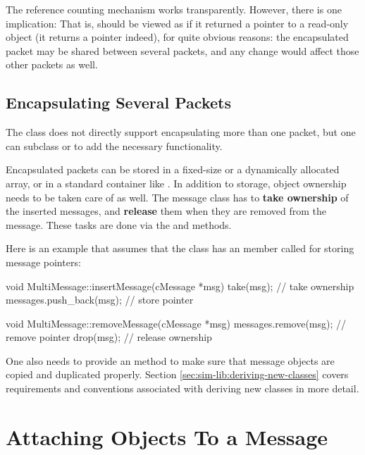 The reference counting mechanism works transparently. However, there
is one implication:  That is,
 should be viewed as if it returned a
pointer to a read-only object (it returns a  pointer
indeed), for quite obvious reasons: the encapsulated packet may be
shared between several packets, and any change would affect those
other packets as well.


\subsection{Encapsulating Several Packets}
\label{sec:messages:encapsulating-several-packets}

The  class does not directly support encapsulating more
than one packet, but one can subclass  or 
to add the necessary functionality.

Encapsulated packets can be stored in a fixed-size or a dynamically
allocated array, or in a standard container like .
In addition to storage, object ownership needs to be taken care of as well.
The message class has to \textbf{take ownership} of the inserted messages, and
\textbf{release} them when they are removed from the message. These tasks are
done via the  and  methods.

Here is an example that assumes that the class has an  member
called  for storing message pointers:

\begin{cpp}
void MultiMessage::insertMessage(cMessage *msg)
{
    take(msg);  // take ownership
    messages.push_back(msg);  // store pointer
}

void MultiMessage::removeMessage(cMessage *msg)
{
    messages.remove(msg);  // remove pointer
    drop(msg);  // release ownership
}
\end{cpp}

One also needs to provide an  method to make sure that
message objects are copied and duplicated properly. Section
\ref{sec:sim-lib:deriving-new-classes} covers requirements and conventions
associated with deriving new classes in more detail.



\section{Attaching Objects To a Message}
\label{sec:msgs:attaching-objects}

